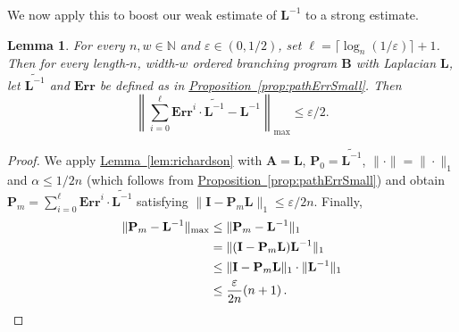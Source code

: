 \documentclass[11pt]{article}
\numberwithin{equation}{section}
\newtheorem{lemma}[theorem]{Lemma}
\theoremstyle{definition}
\theoremstyle{plain}
\newcommand{\N}{\mathbb N}
\newcommand{\expref}[2]{\hyperref[#2]{#1~\ref{#2}}}
\newcommand{\eps}{\varepsilon}
\newcommand{\mA}{\mathbf{A}}
\newcommand{\mP}{\mathbf{P}}
\newcommand{\mL}{\mathbf{L}}
\newcommand{\I}{\mathbf{I}}
\newcommand{\Pm}{\mathbf{P}_m}
\newcommand{\lbar}{\left\|}
\newcommand{\rbar}{\right\|}
\newcommand{\Lt}{\widetilde{\mathbf{L}^{-1}}}
\newcommand{\Err}{\mathbf{Err}}
\newcommand{\bp}{{\mathbf{B}}}
\begin{document}
We now apply this to boost our weak estimate of $\mL^{-1}$ to a strong estimate.
\begin{lemma}
\label{lem:pathStrongErr}
For every $n,w\in \N$ and $\eps \in (0,1/2)$, set $\ell=\lceil \log_{n}(1/\eps)\rceil+1$. Then for every length-$n$, width-$w$ ordered branching program $\bp$ with Laplacian $\mL$, let $\Lt$ and $\Err$ be defined as in \expref{Proposition}{prop:pathErrSmall}. Then
$$\lbar\sum_{i=0}^{\ell}\Err^i\cdot \Lt-\mL^{-1}\rbar_{\max}\leq \eps/2.$$
\end{lemma}
\begin{proof}
We apply \expref{Lemma}{lem:richardson} with $\mA=\mL$, $\mP_0=\Lt$, $\|\cdot\|=\|\cdot\|_1$ and $\alpha\leq 1/2n$ (which follows from \expref{Proposition}{prop:pathErrSmall}) and obtain $\Pm=\sum_{i=0}^{\ell}\Err^i\cdot \Lt$ satisfying $\|\I-\Pm\mL\|_1\leq \eps/2n$. Finally,
\begin{align*}
    \|\Pm-\mL^{-1}\|_{\max} &\leq \|\Pm-\mL^{-1}\|_1\\ 
    &= \|(\I-\Pm \mL)\mL^{-1}\|_1\\
    &\leq \|\I-\Pm\mL\|_1\cdot \|\mL^{-1}\|_1\\
    &\leq \frac{\eps}{2n}(n+1)\,. \qedhere
\end{align*}
\end{proof}
\end{document}
